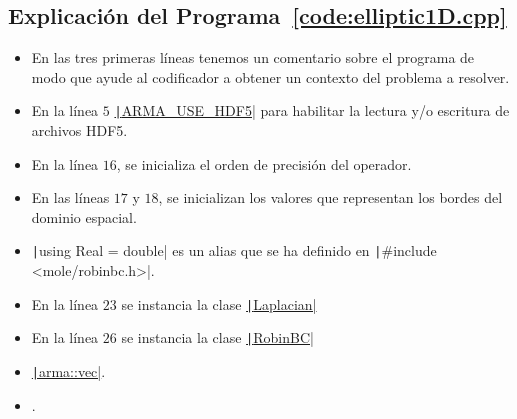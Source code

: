 \begin{problem}

\section*{Explicación del Programa~\ref{code:elliptic1D.cpp}}

\begin{itemize}
      \item

            En las tres primeras líneas tenemos un comentario sobre el
            programa de modo que ayude al codificador a obtener un
            contexto del problema a resolver.

      \item

            En la línea $5$
            \href{https://arma.sourceforge.net/docs.html#config_hpp}{\texttt|ARMA_USE_HDF5|}
            para habilitar la lectura y/o escritura de archivos HDF5.

      \item

            En la línea $16$, se inicializa el orden de precisión del
            operador.

      \item

            En las líneas $17$ y $18$, se inicializan los valores que
            representan los bordes del dominio espacial.

      \item

            \texttt|using Real = double| es un alias que se ha
            definido en \texttt|#include <mole/robinbc.h>|.

      \item

            En la línea $23$ se instancia la clase
            \href{https://carlosal1015.github.io/mole_examples/api_docs/cpp/html/classLaplacian.html}{\texttt|Laplacian|}

      \item

            En la línea $26$ se instancia la clase
            \href{https://carlosal1015.github.io/mole_examples/api_docs/cpp/html/classRobinBC.html}{\texttt|RobinBC|}

      \item

            \href{https://arma.sourceforge.net/docs.html#Col}{\texttt|arma::vec|}.

      \item

            .
\end{itemize}
\noQED %
\end{problem}